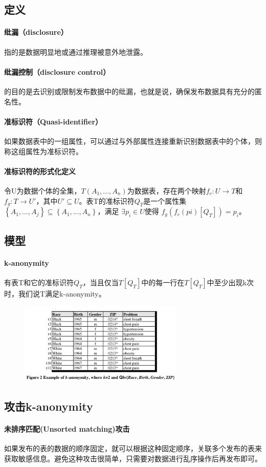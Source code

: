 \documentclass[12pt,a4paper]{article}
\begin{document}
\subsection{定义}
\paragraph{纰漏（disclosure）}指的是数据明显地或通过推理被意外地泄露。
\paragraph{纰漏控制（disclosure control）} 的目的是去识别或限制发布数据中的纰漏，也就是说，确保发布数据具有充分的匿名性。
\paragraph{准标识符（Quasi-identifier）} 如果数据表中的一组属性，可以通过与外部属性连接重新识别数据表中的个体，则称这组属性为准标识符。
\paragraph{准标识符的形式化定义} 令U为数据个体的全集，$T(A_1,...,A_n)$为数据表，存在两个映射$f_c: U \rightarrow T$和$f_g: T \rightarrow U'$，其中$U' \subseteq U$。表T的准标识符$Q_T$是一个属性集$\left \{ A_1,...,A_j\right \} \subseteq \left \{ A_1,...,A_n \right \}$，满足 $\exists p_i \in U $使得 $f_g(f_c(pi)[Q_T]) = p_i$。

\subsection{模型}
\paragraph{k-anonymity} 有表T和它的准标识符$Q_T$，当且仅当$T[Q_T]$中的每一行在$T[Q_T]$中至少出现k次时，我们说T满足k-anonymity。
\begin{figure}[H]
	\centering
	\includegraphics[width=0.7\textwidth]{../images/k-anonymity-example.png}
	\caption{}
	\label{}
\end{figure}

\subsection{攻击k-anonymity}
\paragraph{未排序匹配(Unsorted matching)攻击} 如果发布的表的数据的顺序固定，就可以根据这种固定顺序，关联多个发布的表来获取敏感信息。避免这种攻击很简单，只需要对数据进行乱序操作后再发布即可。
\paragraph{}







\end{document}
